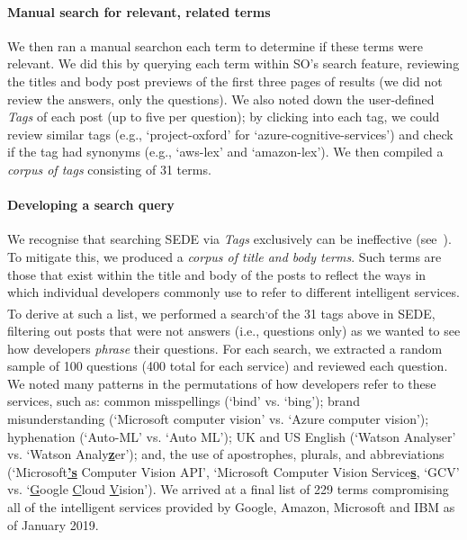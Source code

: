 \paragraph{Manual search for relevant, related terms} 
We then ran a manual search\footnotemark[\footnotesearchdate{}] %
on each term to determine if these terms were relevant. We did this by querying each term within SO's search feature, reviewing the titles and body post previews of the first three pages of results (we did not review the answers, only the questions). We also noted down the user-defined \textit{Tags} of each post (up to five per question); by clicking into each tag, we could review similar tags (e.g., `project-oxford' for `azure-cognitive-services') and check if the tag had synonyms (e.g., `aws-lex' and `amazon-lex'). We then compiled a \textit{corpus of tags} consisting of 31 terms.

\paragraph{Developing a search query}
We recognise that searching SEDE via \textit{Tags} exclusively can be ineffective (see~\citep{Tahir:2018ks,Barua:2012gz}). To mitigate this, we produced a \textit{corpus of title and body terms}. Such terms are those that exist within the title and body of the posts to reflect the ways in which individual developers commonly use to refer to different intelligent services. To derive at such a list, we performed a search\footnotemark[\footnotesearchdate{}]\textsuperscript{,}\footnotemark[\footnotereproducability{}] of the 31 tags above in SEDE, filtering out posts that were not answers (i.e., questions only) as we wanted to see how developers \textit{phrase} their questions. For each search, we extracted a random sample of 100 questions (400 total for each service) and reviewed each question. We noted many patterns in the permutations of how developers refer to these services, such as: common misspellings (`bind' vs. `bing'); brand misunderstanding (`Microsoft computer vision' vs. `Azure computer vision'); hyphenation (`Auto-ML' vs. `Auto ML'); UK and US English (`Watson Analyser' vs. `Watson Analy\underline{\textbf{z}}er'); and, the use of apostrophes, plurals, and abbreviations (`Microsoft\underline{\textbf{'s}} Computer Vision API', `Microsoft Computer Vision Service\underline{\textbf{s}}, `GCV' vs. `\underline{G}oogle \underline{C}loud \underline{V}ision'). We arrived at a final list of 229 terms compromising all of the intelligent services provided by Google, Amazon, Microsoft and IBM as of January 2019\footnotemark[3].


